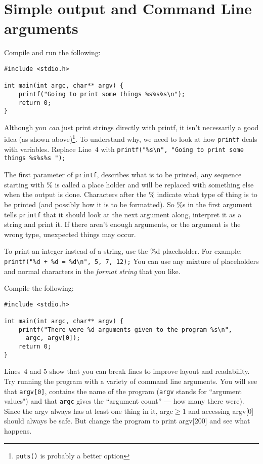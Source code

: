 
\chapter{Simple output and Command Line arguments}
\lstset{numbers=left, showstringspaces=false, frame=l}


Compile and run the following:
\begin{lstlisting}
#include <stdio.h>

int main(int argc, char** argv) {
    printf("Going to print some things %s%s%s\n");
    return 0;
}
\end{lstlisting}

Although you \emph{can} just print strings directly with printf, it isn't necessarily a good idea (as shown above)\footnote{\texttt{puts()} is probably a better option}.
To understand why, we need to look at how \texttt{printf} deals with variables.
Replace Line~$4$ with \lstinline!printf("%s\n", "Going to print some things %s%s%s ");!

The first parameter of \texttt{printf}, describes what is to be printed, any sequence starting with \% is called a place holder and will be replaced with something else when the output is done.
Characters after the \% indicate what type of thing is to be printed (and possibly how it is to be formatted).
So \%s in the first argument tells \texttt{printf} that it should look at the next argument along, interpret it as a string and print it.
If there aren't enough arguments, or the argument is the wrong type, unexpected things may occur.

To print an integer instead of a string, use the \%d placeholder.
For example: \lstinline!printf("%d + %d = %d\n", 5, 7, 12);!
You can use any mixture of placeholders and normal characters in the \emph{format string} that you like.


Compile the following:
\begin{lstlisting}
#include <stdio.h>

int main(int argc, char** argv) {
    printf("There were %d arguments given to the program %s\n",
      argc, argv[0]);
    return 0;
}
\end{lstlisting}
Lines~4 and 5 show that you can break lines to improve layout and readability.
Try running the program with a variety of command line arguments.
You will see that \texttt{argv[0]}, contains the name of the program (\texttt{argv} stands for ``argument values") and that \texttt{argc} gives the ``argument count'' --- how many there were).
Since the argv always has at least one thing in it, argc$\geq 1$ and accessing argv[0] should always be safe.
But change the program to print argv[200] and see what happens.


